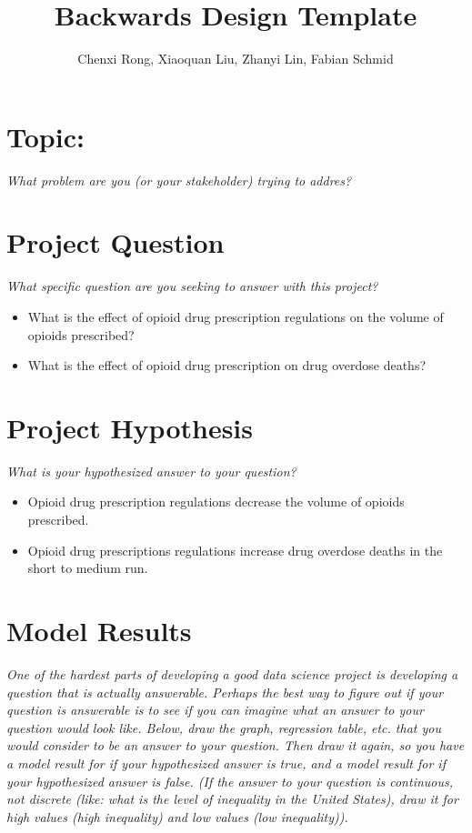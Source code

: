\documentclass[12pt]{article}
\author{Chenxi Rong, Xiaoquan Liu, Zhanyi Lin, Fabian Schmid}
\title{Backwards Design Template}
\begin{document}
\maketitle

\section{Topic:}
\emph{What problem are you (or your stakeholder) trying to addres?}
\vspace*{2cm}\\

\section{Project Question}
\emph{What specific question are you seeking to answer with this project?}
\vspace*{2cm}\\

\begin{itemize}
\item What is the effect of opioid drug prescription regulations on the volume of opioids prescribed?

\item What is the effect of opioid drug prescription on drug overdose deaths?

\end{itemize}


\section{Project Hypothesis}
\emph{What is your hypothesized answer to your question?}
\vspace*{2cm}\\

\begin{itemize}
\item Opioid drug prescription regulations decrease the volume of opioids prescribed.

\item Opioid drug prescriptions regulations increase drug overdose deaths in the short to medium run.
\end{itemize}




\section{Model Results}
\emph{One of the hardest parts of developing a good data science project is developing a question that is actually answerable. Perhaps the best way to figure out if your question is answerable is to see if you can imagine what an answer to your question would look like. Below, draw the graph, regression table, etc. that you would consider to be an answer to your question. Then draw it again, so you have a model result for if your hypothesized answer is true, and a model result for if your hypothesized answer is false. (If the answer to your question is continuous, not discrete (like: what is the level of inequality in the United States), draw it for high values (high inequality) and low values (low inequality)).}
\end{document}
